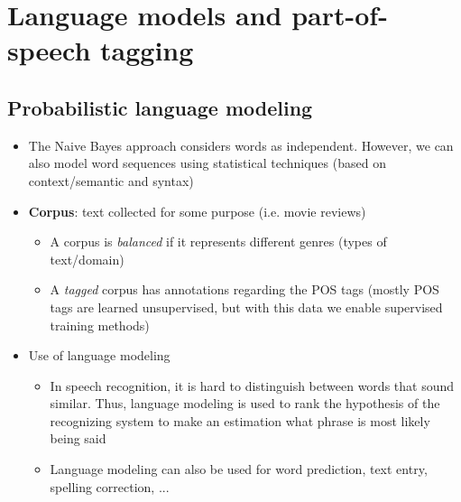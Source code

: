 \section{Language models and part-of-speech tagging}
\subsection{Probabilistic language modeling}
\begin{itemize}
	\item The Naive Bayes approach considers words as independent. However, we can also model word sequences using statistical techniques (based on context/semantic and syntax)
	\item \textbf{Corpus}: text collected for some purpose (i.e. movie reviews)
	\begin{itemize}
		\item A corpus is \textit{balanced} if it represents different genres (types of text/domain)
		\item A \textit{tagged} corpus has annotations regarding the POS tags (mostly POS tags are learned unsupervised, but with this data we enable supervised training methods)
	\end{itemize}
	\item Use of language modeling
	\begin{itemize}
		\item In speech recognition, it is hard to distinguish between words that sound similar. Thus, language modeling is used to rank the hypothesis of the recognizing system to make an estimation what phrase is most likely being said
		\item Language modeling can also be used for word prediction, text entry, spelling correction, ...
	\end{itemize}
\end{itemize}
